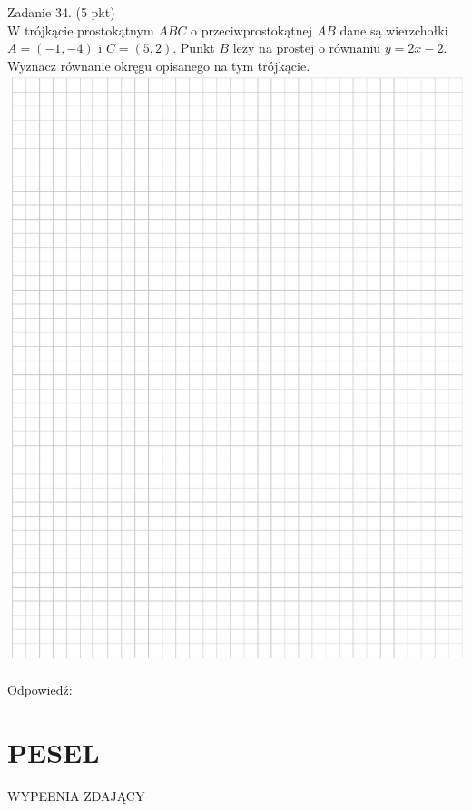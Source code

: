 \documentclass[10pt]{article}
\begin{document}
Zadanie 34. (5 pkt)\\
W trójkącie prostokątnym \(A B C\) o przeciwprostokątnej \(A B\) dane są wierzchołki \(A=(-1,-4)\) i \(C=(5,2)\). Punkt \(B\) leży na prostej o równaniu \(y=2 x-2\). Wyznacz równanie okręgu opisanego na tym trójkącie.\\
\includegraphics[max width=\textwidth, center]{2024_11_21_b31e6de468170710de69g-18}\\
\(\qquad\)\\
Odpowiedź:

\section*{PESEL}
WYPEENIA ZDAJĄCY
\end{document}
